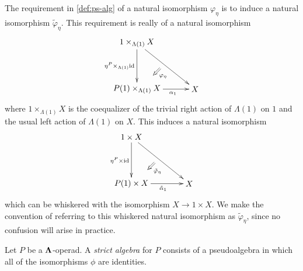 \begin{rem}
  The requirement in \cref{def:ps-alg} of a natural isomorphism $\varphi_\eta$ is to induce a natural isomorphism $\tilde{\varphi}_\eta$. This requirement is really of a natural isomorphism
    \[
      \xy
        (0,0)*+{1 \times_{\Lambda(1)} X}="a";
        (0,-20)*+{P(1) \times_{\Lambda(1)} X}="b";
        (25,-20)*+{X}="c";
        {\ar_{\eta^P \times_{\Lambda(1)} \id} "a" ; "b"};
        {\ar_<<<<<{\alpha_1} "b" ; "c"};
        {\ar "a" ; "c"};
        {\ar@{=>}^{\varphi_\eta} (10,-11) ; (7,-14)};
      \endxy
    \]
  where $1 \times_{\Lambda(1)} X$ is the coequalizer of the trivial right action of $\Lambda(1)$ on $1$ and the usual left action of $\Lambda(1)$ on $X$. This induces a natural isomorphism
    \[
      \xy
        (0,0)*+{1 \times X}="a";
        (0,-20)*+{P(1) \times X}="b";
        (25,-20)*+{X}="c";
        {\ar_{\eta^P \times \id} "a" ; "b"};
        {\ar_<<<<<<{\tilde{\alpha}_1} "b" ; "c"};
        {\ar "a" ; "c"};
        {\ar@{=>}^{\tilde{\varphi}_\eta} (10,-11) ; (7,-14)};
      \endxy
    \]
  which can be whiskered with the isomorphism $X \rightarrow 1 \times X$. We make the convention of referring to this whiskered natural isomorphism as $\tilde{\varphi}_\eta$, since no confusion will arise in practice.
\end{rem}

\begin{Defi}
Let $P$ be a $\mathbf{\Lambda}$-operad. A \textit{strict algebra} for $P$ consists of a pseudoalgebra in which all of the isomorphisms $\phi$ are identities.
\end{Defi}

